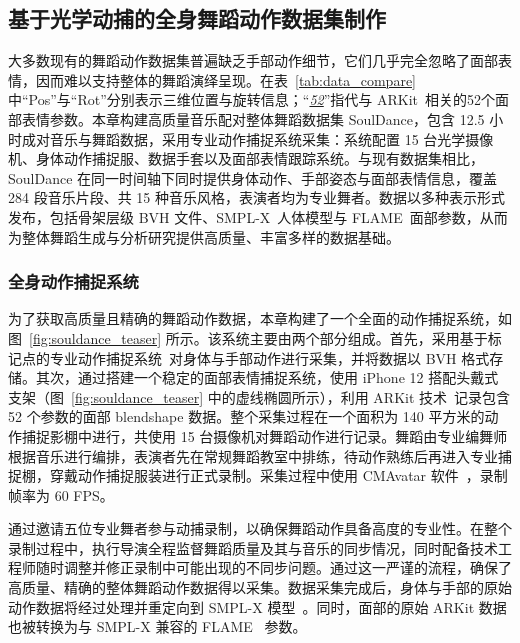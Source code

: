 \subsection{基于光学动捕的全身舞蹈动作数据集制作}
大多数现有的舞蹈动作数据集普遍缺乏手部动作细节，它们几乎完全忽略了面部表情，因而难以支持整体的舞蹈演绎呈现。在表~\ref{tab:data_compare} 中“Pos”与“Rot”分别表示三维位置与旋转信息；“\underline{\textit{52}}”指代与 ARKit~\cite{baruch2021arkitscenes}相关的52个面部表情参数。本章构建高质量音乐配对整体舞蹈数据集 SoulDance，包含 12.5 小时成对音乐与舞蹈数据，采用专业动作捕捉系统采集：系统配置 15 台光学摄像机、身体动作捕捉服、数据手套以及面部表情跟踪系统。与现有数据集相比，SoulDance 在同一时间轴下同时提供身体动作、手部姿态与面部表情信息，覆盖 284 段音乐片段、共 15 种音乐风格，表演者均为专业舞者。数据以多种表示形式发布，包括骨架层级 BVH 文件、SMPL-X~\cite{SMPL-X:2019}人体模型与 FLAME~\cite{FLAME:SiggraphAsia2017}面部参数，从而为整体舞蹈生成与分析研究提供高质量、丰富多样的数据基础。



\subsubsection{全身动作捕捉系统}
\label{motion_captrue}
为了获取高质量且精确的舞蹈动作数据，本章构建了一个全面的动作捕捉系统，如图~\ref{fig:souldance_teaser} 所示。该系统主要由两个部分组成。首先，采用基于标记点的专业动作捕捉系统~\cite{chingmu}对身体与手部动作进行采集，并将数据以 BVH 格式存储。其次，通过搭建一个稳定的面部表情捕捉系统，使用 iPhone 12 搭配头戴式支架（图~\ref{fig:souldance_teaser} 中的虚线椭圆所示），利用 ARKit 技术~\cite{baruch2021arkitscenes}记录包含 52 个参数的面部 blendshape 数据。整个采集过程在一个面积为 140 平方米的动作捕捉影棚中进行，共使用 15 台摄像机对舞蹈动作进行记录。舞蹈由专业编舞师根据音乐进行编排，表演者先在常规舞蹈教室中排练，待动作熟练后再进入专业捕捉棚，穿戴动作捕捉服装进行正式录制。采集过程中使用 CMAvatar 软件~\cite{chingmu}，录制帧率为 60 FPS。


通过邀请五位专业舞者参与动捕录制，以确保舞蹈动作具备高度的专业性。在整个录制过程中，执行导演全程监督舞蹈质量及其与音乐的同步情况，同时配备技术工程师随时调整并修正录制中可能出现的不同步问题。通过这一严谨的流程，确保了高质量、精确的整体舞蹈动作数据得以采集。数据采集完成后，身体与手部的原始动作数据将经过处理并重定向到 SMPL-X 模型~\cite{SMPL-X:2019}。同时，面部的原始 ARKit 数据也被转换为与 SMPL-X 兼容的 FLAME~\cite{FLAME:SiggraphAsia2017} 参数。


